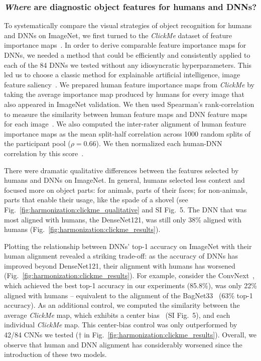 \subsubsection{\textit{Where} are diagnostic object features for humans and DNNs?} To systematically compare the visual strategies of object recognition for humans and DNNs on ImageNet, we first turned to the \textit{ClickMe} dataset of feature importance maps~\cite{Linsley2019-ew}. In order to derive comparable feature importance maps for DNNs, we needed a method that could be efficiently and consistently applied to each of the 84 DNNs we tested without any idiosyncratic hyperparameters. This led us to choose a classic method for explainable artificial intelligence, image feature saliency~\cite{Simonyan2013-ln}. We prepared human feature importance maps from \textit{ClickMe} by taking the average importance map produced by humans for every image that also appeared in ImageNet validation. We then used Spearman's rank-correlation to measure the similarity between human feature maps and DNN feature maps for each image~\cite{Eberhardt2016-cw}. We also computed the inter-rater alignment of human feature importance maps as the mean split-half correlation across 1000 random splits of the participant pool ($\rho=0.66$). We then normalized each human-DNN correlation by this score~\cite{Linsley2019-ew}.

There were dramatic qualitative differences between the features selected by humans and DNNs on ImageNet. In general, humans selected less context and focused more on object parts: for animals, parts of their faces; for non-animals, parts that enable their usage, like the spade of a shovel (see Fig.~\ref{fig:harmonization:clickme_qualitative} and SI Fig.~5. The DNN that was most aligned with humans, the DenseNet121, was still only 38\% aligned with humans (Fig.~\ref{fig:harmonization:clickme_results}).

Plotting the relationship between DNNs' top-1 accuracy on ImageNet with their human alignment revealed a striking trade-off: as the accuracy of DNNs has improved beyond DenseNet121, their alignment with humans has worsened (Fig.~\ref{fig:harmonization:clickme_results}). For example, consider the ConvNext~\cite{Liu2022-es}, which achieved the best top-1 accuracy in our experiments (85.8\%), was only 22\% aligned with humans -- equivalent to the alignment of the BagNet33~\cite{Brendel2019-mw} (63\% top-1 accuracy). As an additional control, we computed the similarity between the average \textit{ClickMe} map, which exhibits a center bias~\cite{Deza2020-fq,Wang2017-dp} (SI Fig.~5), and each individual \textit{ClickMe} map. This center-bias control was only outperformed by 42/84 CNNs we tested ($\dagger$ in Fig.~\ref{fig:harmonization:clickme_results}). Overall, we observe that human and DNN alignment has considerably worsened since the introduction of these two models.

